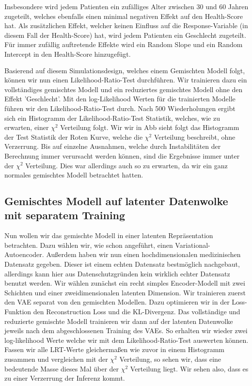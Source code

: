 \documentclass[%
thesis=student,%
coverpage=false,%
titlepage=false,%
headmarks=true, %
german,%
font=libertine, %
math=newpxtx, %
BCOR=5mm,%
coverBCOR=11mm%
]{tumbook}
\theoremstyle{break}
\begin{document}
Insbesondere wird jedem Patienten ein zufälliges Alter zwischen 30 und 60 Jahren zugeteilt, welches ebenfalls einen minimal negativen Effekt auf den Health-Score hat. Als zusätzlichen Effekt, welcher keinen Einfluss auf die Response-Variable (in diesem Fall der Health-Score) hat, wird jedem Patienten ein Geschlecht zugeteilt. Für immer zufällig auftretende Effekte wird ein Random Slope und ein Random Intercept in den Health-Score hinzugefügt. 


Basierend auf diesem Simulationsdesign, welches einem Gemischten Modell folgt, können wir nun einen Likelihood-Ratio-Test durchführen. Wir trainieren dazu ein vollständiges gemischtes Modell und ein reduziertes gemischtes Modell ohne den Effekt 'Geschlecht'. Mit den log-Likelihood Werten für die trainierten Modelle führen wir den Likelihood-Ratio-Test durch. Nach 500 Wiederholungen ergibt sich ein Histogramm der Likelihood-Ratio-Test Statistik, welches, wie zu erwarten, einer $\chi^2$ Verteilung folgt. Wir wir in Abb sieht folgt das Histogramm der Test Statistik der Roten Kurve, welche die $\chi^2$ Verteilung beschreibt, ohne Verzerrung. Bis auf einzelne Ausnahmen, welche durch Instabilitäten der Berechnung immer verursacht werden können, sind die Ergebnisse immer unter der $\chi^2$ Verteilung. Dies war allerdings auch so zu erwarten, da wir ein ganz normales gemischtes Modell betrachtet hatten.
\subsection{Gemischtes Modell auf latenter Datenwolke mit separatem Training}
Nun wollen wir das gemischte Modell in einer latenten Repräsentation betrachten. Dazu wählen wir, wie schon angeführt, einen Variational-Autoencoder. Außerdem haben wir nun einen hochdimensionalen medizinischen Datensatz gegeben. Dieser ist einem echten Datensatz bestmöglich nachgebaut, allerdings kann hier aus Datenschutzgründen kein wirklich echter Datensatz benutzt werden. Wir wählen zunächst ein recht simples Encoder-Modell mit zwei Schichten und einer zweidimensionalen latenten Dimension. 
Wir trainieren zuerst den VAE separat von den gemischten Modellen. Dazu optimieren wir in der Loss-Funktion den Reconstruction Loss und die KL-Divergenz. Das vollständige und reduzierte gemischte Modell trainieren wir dann auf der latenten Datenwolke jeweils nach dem abgeschlossenen Training des VAEs. So erhalten wir wieder zwei log-likelihood Werte welche wir mit dem Likelihood-Ratio-Test auswerten können. Fassen wir alle LRT-Werte gleichermaßen wie zuvor in einem Histogramm zusammen und vergleichen mit der $\chi^2$ Verteilung, so sehen wir, dass eine bedeutende Masse dieses Mal über der $\chi^2$ Verteilung liegt. Wir sehen also, dass es zu einer Verzerrung der Inferenz kommt. 
\end{document}
